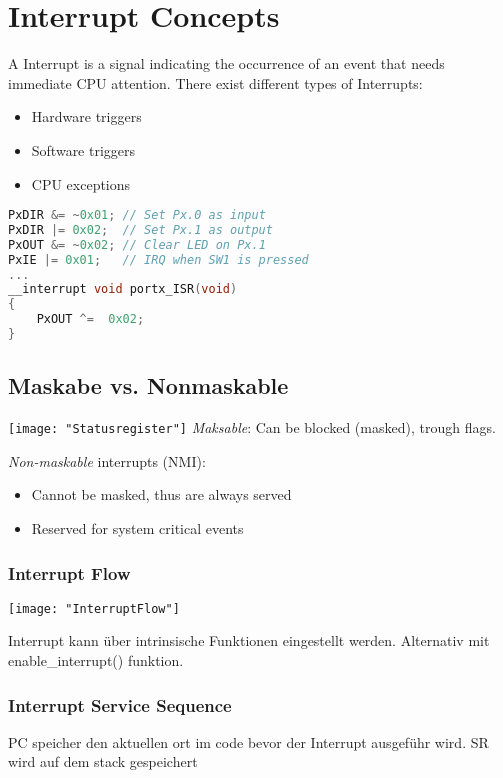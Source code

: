 \section{Interrupt Concepts }
A Interrupt is a signal indicating the occurrence of an event that needs immediate CPU attention.
There exist different types of Interrupts:
\begin{itemize}
	\itemsep-.5em 
	\item Hardware triggers
	\item Software triggers
	\item CPU exceptions
\end{itemize}

\begin{lstlisting}[language=c]
PxDIR &= ~0x01;	// Set Px.0 as input
PxDIR |= 0x02;	// Set Px.1 as output
PxOUT &= ~0x02;	// Clear LED on Px.1
PxIE |= 0x01;	// IRQ when SW1 is pressed
...
__interrupt void portx_ISR(void)
{
	PxOUT ^=  0x02;
}
\end{lstlisting}

\subsection{Maskabe vs. Nonmaskable }
\texttt{[image: "Statusregister"]}
\textit{Maksable}: Can be blocked (masked), trough flags.

\textit{Non-maskable} interrupts (NMI):
\begin{itemize}
	\itemsep-.5em 
	\item Cannot be masked, thus are always served
	\item Reserved for system critical events
\end{itemize}

\subsubsection{Interrupt Flow}
\texttt{[image: "InterruptFlow"]}

Interrupt kann über intrinsische Funktionen eingestellt werden.
Alternativ mit enable\_interrupt() funktion.


\subsubsection{Interrupt Service Sequence }
PC speicher den aktuellen ort im code bevor der Interrupt ausgeführ wird.
SR wird auf dem stack gespeichert

